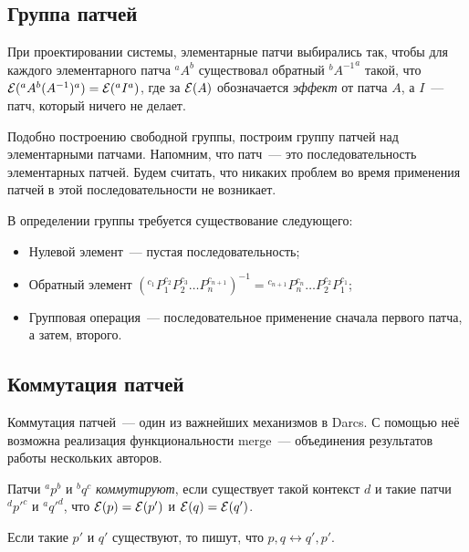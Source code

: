 \subsection{Группа патчей}

При проектировании системы, элементарные патчи выбирались так, чтобы
для каждого элементарного патча ${}^aA^b$ существовал обратный
${}^b{A^{-1}}^a$ такой, что ${\cal E}({}^aA^b(A^{-1})^a) = {\cal
  E}({}^aI^a)$, где за ${\cal E}(A)$ обозначается \emph{эффект} от
патча $A$, а $I$~--- патч, который ничего не делает.

Подобно построению свободной группы, построим группу патчей над
элементарными патчами. Напомним, что патч~--- это последовательность
элементарных патчей. Будем считать, что никаких проблем во время
применения патчей в этой последовательности не возникает.

\begin{definition}
  В определении группы требуется существование следующего:

  \begin{itemize}
  \item Нулевой элемент~--- пустая последовательность;
  \item Обратный элемент
    $({}^{c_1}P_1^{c_2}P_2^{c_3}\ldots P_n^{c_{n+1}})^{-1} =
    {}^{c_{n+1}}P_n^{c_n}\ldots P_2^{c_2}P_1^{c_1}$;
  \item Групповая операция~--- последовательное применение сначала
    первого патча, а затем, второго.
  \end{itemize}
\end{definition}

\subsection{Коммутация патчей}

Коммутация патчей~--- один из важнейших механизмов в Darcs. С помощью
неё возможна реализация функциональности merge~--- объединения
результатов работы нескольких авторов.

\begin{definition}
  Патчи ${}^ap^b$ и ${}^bq^c$ \emph{коммутируют}, если существует
  такой контекст $d$ и такие патчи ${}^d{p'}^c$ и ${}^a{q'}^d$, что
  ${\cal E}(p) = {\cal E}(p')$ и ${\cal E}(q) = {\cal E}(q')$.

  Если такие $p'$ и $q'$ существуют, то пишут, что $p, q
  \longleftrightarrow q', p'$.
\end{definition}


